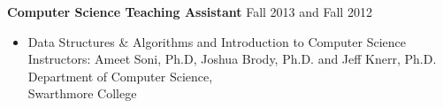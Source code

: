 \documentclass[10pt]{article}
\renewcommand{\section}[1]{\pagebreak[3]%
  \hyphenpenalty=10000%
  \vspace{1.3\baselineskip}%
  \phantomsection\addcontentsline{toc}{section}{#1}%
  \noindent\llap{\scshape\smash{\parbox[t]{\marginparwidth}{\raggedright #1}}}%
\vspace{-\baselineskip}\par}
\newenvironment{innerlist}[1][\enskip\textbullet]%
            {\begin{itemize}[#1,leftmargin=*,parsep=0pt,itemsep=0pt,topsep=0pt,partopsep=0pt]}
            {\end{itemize}}
\begin{document}
              {\bf{Computer Science Teaching Assistant}} \hfill {Fall 2013 and Fall 2012}
              \begin{innerlist}
              \item[]  Data Structures \& Algorithms and Introduction to Computer Science\\
                Instructors: Ameet Soni, Ph.D, Joshua Brody, Ph.D. and Jeff Knerr, Ph.D. \\
                Department of Computer Science,\\
                Swarthmore College
              \end{innerlist}

\end{document}
